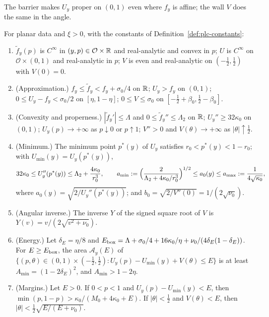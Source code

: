 The barrier makes $U_y$ proper on $(0,1)$ even where $f_y$ is affine; the wall $V$ does the same in the angle.

\begin{lemma}\label{lem:plc-potentials}
For planar data and $\xi>0$, with the constants of Definition~\ref{def:plc-constants}:
\begin{enumerate}[label=(\alph*)]
\item $\tilde f_y(p)$ is $C^\infty$ in $(y,p)\in\mathcal O\times\mathbb{R}$ and real-analytic and convex in $p$; $U$ is $C^\infty$ on
 $\mathcal O\times(0,1)$ and real-analytic in $p$; $V$ is even and real-analytic on $(-\frac12,\frac12)$ with $V(0)=0$.
\item (Approximation.) $f_y\le \tilde f_y<f_y+\sigma_0/4$ on $\mathbb{R}$; $U_y>f_y$ on $(0,1)$; $0\le U_y-f_y<\sigma_0/2$ on
 $[\eta,1-\eta]$; $0\le V\le\sigma_0$ on $[-\frac12+\beta_0,\frac12-\beta_0]$.
\item (Convexity and properness.) $|\tilde f_y'|\le\Lambda$ and $0\le \tilde f_y''\le\Lambda_2$ on $\mathbb{R}$; $U_y''\ge32\kappa_0$ on $(0,1)$;
 $U_y(p)\to+\infty$ as $p\downarrow0$ or $p\uparrow1$; $V''>0$ and $V(\theta)\to+\infty$ as $|\theta|\uparrow\frac12$.

\item (Minimum.) The minimum point $p^*(y)$ of $U_y$ satisfies $r_0<p^*(y)<1-r_0$; with $U_{\min}(y)=U_y(p^*(y))$,
 \[
  32\kappa_0\le U_y''(p^*(y))\le\Lambda_2+\frac{4\kappa_0}{r_0^3},\qquad
  a_{\min}:=\Bigl(\frac{2}{\Lambda_2+4\kappa_0/r_0^3}\Bigr)^{1/2}\le a_0(y)\le a_{\max}:=\frac1{4\sqrt{\kappa_0}},
 \]
 where $a_0(y)=\sqrt{2/U_y''(p^*(y))}$; and $b_0=\sqrt{2/V''(0)}=1/(2\sqrt{\nu_0})$.
\item (Angular inverse.) The inverse $Y$ of the signed square root of $V$ is $Y(v)=v/(2\sqrt{v^2+\nu_0})$.
\item (Energy.) Let $\delta_E=\eta/8$ and $E_{\rm box}=\Lambda+\sigma_0/4+16\kappa_0/\eta+\nu_0/(4\delta_E(1-\delta_E))$. For
 $E\ge E_{\rm box}$, the area $\mathcal A_y(E)$ of $\{(p,\theta)\in(0,1)\times(-\frac12,\frac12):U_y(p)-U_{\min}(y)+V(\theta)\le E\}$ is at least
 $A_{\min}=(1-2\delta_E)^2$, and $A_{\min}>1-2\eta$.
\item (Margins.) Let $E>0$. If $0<p<1$ and $U_y(p)-U_{\min}(y)<E$, then
 $\min(p,1-p)>\kappa_0/(M_0+4\kappa_0+E)$. If $|\theta|<\frac12$ and $V(\theta)<E$, then
 $|\theta|<\frac12\sqrt{E/(E+\nu_0)}$.
\end{enumerate}
\end{lemma}

